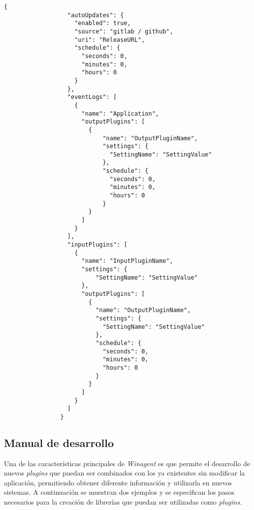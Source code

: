             \begin{lstlisting}[style=csharp, caption=Fichero de configuración]
                {
                  "autoUpdates": {
                    "enabled": true,
                    "source": "gitlab / github",
                    "uri": "ReleaseURL",
                    "schedule": {
                      "seconds": 0,
                      "minutes": 0,
                      "hours": 0
                    }
                  },
                  "eventLogs": [
                    {
                      "name": "Application",
                      "outputPlugins": [
                        {
                            "name": "OutputPluginName",
                            "settings": {
                              "SettingName": "SettingValue"
                            },
                            "schedule": {
                              "seconds": 0,
                              "minutes": 0,
                              "hours": 0
                            }
                        }
                      ]
                    }
                  ],
                  "inputPlugins": [
                    {
                      "name": "InputPluginName",
                      "settings": {
                          "SettingName": "SettingValue"
                      },
                      "outputPlugins": [
                        {
                          "name": "OutputPluginName",
                          "settings": {
                            "SettingName": "SettingValue"
                          },
                          "schedule": {
                            "seconds": 0,
                            "minutes": 0,
                            "hours": 0
                          }
                        }
                      ]
                    }
                  ]
                }
            \end{lstlisting}
            
            
        
    \subsection{Manual de desarrollo}
        Una de las características principales de \textit{Winagent} es que permite el desarrollo de nuevos \textit{plugins} que puedan ser combinados con los ya existentes sin modificar la aplicación, permitiendo obtener diferente información y utilizarla en nuevos sistemas. A continuación se muestran dos ejemplos y se especifican los pasos necesarios para la creación de librerías que puedan ser utilizadas como \textit{plugins}.
        
